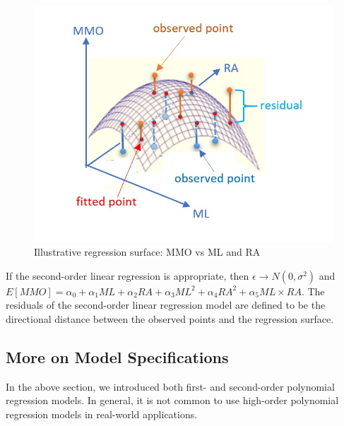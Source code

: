 \documentclass[
]{book}
\begin{document}
\begin{figure}

{\centering \includegraphics[width=0.8\linewidth]{img10/w10-RegressionSurface} 

}

\caption{Illustrative regression surface: MMO vs ML and RA}\label{fig:unnamed-chunk-154}
\end{figure}

If the second-order linear regression is appropriate, then \(\epsilon \to N(0, \sigma^2)\) and \(E[MMO] = \alpha_0 + \alpha_1 ML + \alpha_2 RA + \alpha_3 ML^2 + \alpha_4 RA^2 + \alpha_5 ML\times RA\). The residuals of the second-order linear regression model are defined to be the directional distance between the observed points and the regression surface.

\hypertarget{more-on-model-specifications}{%
\subsection{More on Model Specifications}\label{more-on-model-specifications}}

In the above section, we introduced both first- and second-order polynomial regression models. In general, it is not common to use high-order polynomial regression models in real-world applications.
\end{document}

